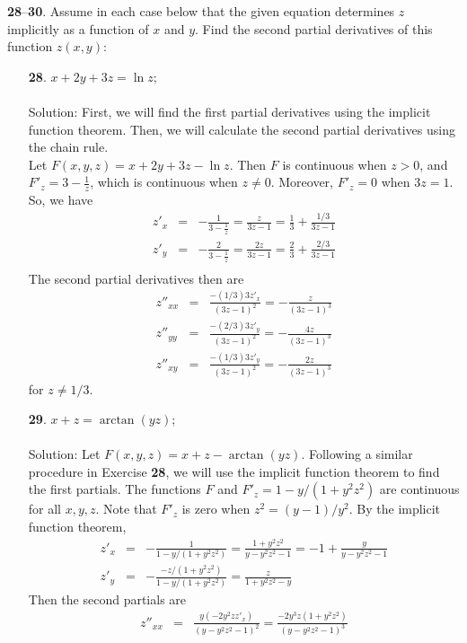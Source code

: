 \documentclass[12pt]{amsbook}
\begin{document}
\noindent
{\small {\bf 28}--{\bf 30}}. Assume in each case below that the given equation determines $z$
implicitly as a function of $x$ and $y$. Find the second partial derivatives of
this function $z(x, y)$:
\begin{enumerate}
\item[{\small\bf 28}.] $x+2y+3z=\ln z$;
\\
\\
{\sc Solution}: First, we will find the first partial derivatives using the implicit function theorem. Then, we will calculate the second partial derivatives using the chain rule.
\\
Let $F(x,y,z)=x+2y+3z-\ln z$. Then $F$ is continuous when $z>0$, and $F'_z=3-\frac{1}{z}$, which is continuous when $z \neq 0$. Moreover, $F'_z=0$ when $3z=1$. So, we have
\begin{eqnarray*}
z'_x&=&-\frac{1}{3-\frac{1}{z}}=\frac{z}{3z-1}=\frac{1}{3}+\frac{1/3}{3z-1} \\
z'_y&=&-\frac{2}{3-\frac{1}{z}}=\frac{2z}{3z-1}=\frac{2}{3}+\frac{2/3}{3z-1} \\
\end{eqnarray*}
The second partial derivatives then are
\begin{eqnarray*}
z''_{xx}&=&\frac{-(1/3)3z'_x}{(3z-1)^2}=-\frac{z}{(3z-1)^3} \\
z''_{yy}&=&\frac{-(2/3)3z'_y}{(3z-1)^2}=-\frac{4z}{(3z-1)^3} \\
z''_{xy}&=&\frac{-(1/3)3z'_y}{(3z-1)^2}=-\frac{2z}{(3z-1)^3}
\end{eqnarray*}
for $z \neq 1/3$. 
\\
\item[{\small\bf 29}.] $x+z=\arctan(yz)$;
\\
\\
{\sc Solution}: Let $F(x,y,z) = x+z-\arctan(yz)$. Following a similar procedure in Exercise {\bf 28}, we will use the implicit function theorem to find the first partials. The functions $F$ and $F'_z = 1-y/(1+y^2z^2)$ are continuous for all $x,y,z$. Note that $F'_z$ is zero when $z^2=(y-1)/y^2$. By the implicit function theorem,
\begin{eqnarray*}
z'_x&=&-\frac{1}{1-y/(1+y^2z^2)}=\frac{1+y^2z^2}{y-y^2z^2-1} =-1+\frac{y}{y-y^2z^2-1} \\
z'_y&=&-\frac{-z/(1+y^2z^2)}{1-y/(1+y^2z^2)} = \frac{z}{1+y^2z^2-y}
\end{eqnarray*}
Then the second partials are
\begin{eqnarray*}
z''_{xx}&=&\frac{y(-2y^2zz'_x)}{(y-y^2z^2-1)^2}=\frac{-2y^3z(1+y^2z^2)}{(y-y^2z^2-1)^3} \\

\end{eqnarray*}
\end{enumerate}
\end{document}
